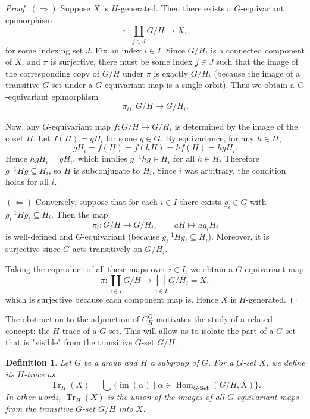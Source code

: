 \documentclass{amsart}
\newtheorem{definition}{Definition}
\begin{document}
\begin{proof}
$(\Rightarrow)$ Suppose $X$ is $H$-generated. Then there exists a $G$-equivariant epimorphism
\[
\pi \colon \coprod_{j \in J} G/H \longrightarrow X,
\]
for some indexing set $J$. Fix an index $i \in I$. Since $G/H_i$ is a connected component of $X$, and $\pi$ is surjective, there must be some index $j \in J$ such that the image of the corresponding copy of $G/H$ under $\pi$ is exactly $G/H_i$ (because the image of a transitive $G$-set under a $G$-equivariant map is a single orbit). Thus we obtain a $G$-equivariant epimorphism
\[
\pi_{ij} \colon G/H \longrightarrow G/H_i.
\]

Now, any $G$-equivariant map $f \colon G/H \rightarrow G/H_i$ is determined by the image of the coset $H$. Let $f(H) = g H_i$ for some $g \in G$. By equivariance, for any $h \in H$,
\[
g H_i = f(H) = f(hH) = h f(H) = h g H_i.
\]
Hence $h g H_i = g H_i$, which implies $g^{-1} h g \in H_i$ for all $h \in H$. Therefore $g^{-1} H g \subseteq H_i$, so $H$ is subconjugate to $H_i$. Since $i$ was arbitrary, the condition holds for all $i$.

$(\Leftarrow)$ Conversely, suppose that for each $i \in I$ there exists $g_i \in G$ with $g_i^{-1} H g_i \subseteq H_i$. Then the map
\[
\pi_i \colon G/H \longrightarrow G/H_i, \qquad aH \longmapsto a g_i H_i
\]
is well-defined and $G$-equivariant (because $g_i^{-1} H g_i \subseteq H_i$). Moreover, it is surjective since $G$ acts transitively on $G/H_i$.

Taking the coproduct of all these maps over $i \in I$, we obtain a $G$-equivariant map
\[
\pi \colon \coprod_{i \in I} G/H \longrightarrow \bigsqcup_{i \in I} G/H_i = X,
\]
which is surjective because each component map is. Hence $X$ is $H$-generated.
\end{proof}

The obstruction to the adjunction of $C_H^G$ motivates the study of a related concept: the $H$-trace of a $G$-set. This will allow us to isolate the part of a $G$-set that is "visible" from the transitive $G$-set $G/H$.

\begin{definition}\label{def:H_trace}
Let $G$ be a group and $H$ a subgroup of $G$. For a $G$-set $X$, we define its \emph{$H$-trace} as
\[
\operatorname{Tr}_H(X) = \bigcup \bigl\{ \operatorname{im}(\alpha) \mid \alpha \in \operatorname{Hom}_{G\text{-}\mathbf{Set}}(G/H, X) \bigr\}.
\]
In other words, $\operatorname{Tr}_H(X)$ is the union of the images of all $G$-equivariant maps from the transitive $G$-set $G/H$ into $X$.
\end{definition}
\end{document}
